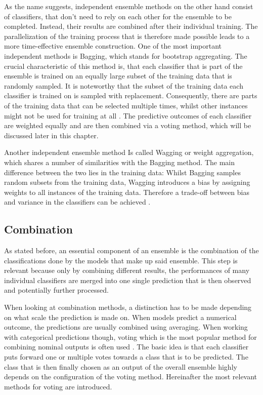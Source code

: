 As the name suggests, independent ensemble methods on the other hand consist of classifiers, that don’t need to rely on each other for the ensemble to be completed. Instead, their results are combined after their individual training. The parallelization of the training process that is therefore made possible leads to a more time-effective ensemble construction. One of the most important independent methods is Bagging, which stands for bootstrap aggregating. The crucial characteristic of this method is, that each classifier that is part of the ensemble is trained on an equally large subset of the training data that is randomly sampled. It is noteworthy that the subset of the training data each classifier is trained on is sampled with replacement. Consequently, there are parts of the training data that can be selected multiple times, whilst other instances might not be used for training at all \cite{martinez-munoz2004}. The predictive outcomes of each classifier are weighted equally and are then combined via a voting method, which will be discussed later in this chapter.

Another independent ensemble method Is called Wagging or weight aggregation, which shares a number of similarities with the Bagging method. The main difference between the two lies in the training data: Whilst Bagging samples random subsets from the training data, Wagging introduces a bias by assigning weights to all instances of the training data. Therefore a trade-off between bias and variance in the classifiers can be achieved \cite{bauer1999}.



\subsection{Combination}

As stated before, an essential component of an ensemble is the combination of the classifications done by the models that make up said ensemble. This step is relevant because only by combining different results, the performances of many individual classifiers are merged into one single prediction that is then observed and potentially further processed. 

When looking at combination methods, a distinction has to be made depending on what scale the prediction is made on. When models predict a numerical outcome, the predictions are usually combined using averaging. When working with categorical predictions though, voting which is the most popular method for combining nominal outputs is often used \cite{zhou2012}. The basic idea is that each classifier puts forward one or multiple votes towards a class that is to be predicted. The class that is then finally chosen as an output of the overall ensemble highly depends on the configuration of the voting method. Hereinafter the most relevant methods for voting are introduced. 

